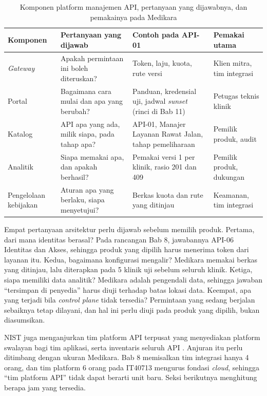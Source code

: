 \begin{table}[!htb]
  \centering
  \caption{Komponen platform manajemen API, pertanyaan yang dijawabnya, dan pemakainya pada Medikara}
  \label{tab:ch10-komponen}
  \footnotesize
  \begin{tabularx}{\textwidth}{H{1.8cm}GGH{2.3cm}}
    \hline
    \textbf{Komponen} & \textbf{Pertanyaan yang dijawab} & \textbf{Contoh pada API-01} & \textbf{Pemakai utama} \\ \hline
    \textit{Gateway} & Apakah permintaan ini boleh diteruskan? & Token, laju, kuota, rute versi & Klien mitra, tim integrasi \\ \hline
    Portal & Bagaimana cara mulai dan apa yang berubah? & Panduan, kredensial uji, jadwal \textit{sunset} (rinci di Bab 11) & Petugas teknis klinik \\ \hline
    Katalog & API apa yang ada, milik siapa, pada tahap apa? & API-01, Manajer Layanan Rawat Jalan, tahap pemeliharaan & Pemilik produk, audit \\ \hline
    Analitik & Siapa memakai apa, dan apakah berhasil? & Pemakai versi 1 per klinik, rasio 201 dan 409 & Pemilik produk, dukungan \\ \hline
    Pengelolaan kebijakan & Aturan apa yang berlaku, siapa menyetujui? & Berkas kuota dan rute yang ditinjau & Keamanan, tim integrasi \\ \hline
  \end{tabularx}
\end{table}

Empat pertanyaan arsitektur perlu dijawab sebelum memilih produk. Pertama, dari mana identitas berasal? Pada rancangan
Bab 8, jawabannya API-06 Identitas dan Akses, sehingga produk yang dipilih harus menerima token dari layanan itu. Kedua,
bagaimana konfigurasi mengalir? Medikara memakai berkas yang ditinjau, lalu diterapkan pada 5 klinik uji sebelum seluruh
klinik. Ketiga, siapa memiliki data analitik? Medikara adalah pengendali data, sehingga jawaban ``tersimpan di
penyedia'' harus diuji terhadap batas lokasi data. Keempat, apa yang terjadi bila \textit{control plane} tidak tersedia?
Permintaan yang sedang berjalan sebaiknya tetap dilayani, dan hal ini perlu diuji pada produk yang dipilih, bukan
diasumsikan.

NIST juga menganjurkan tim platform API terpusat yang menyediakan platform swalayan bagi tim aplikasi, serta inventaris
seluruh API \cite{nist-sp800-228}. Anjuran itu perlu ditimbang dengan ukuran Medikara. Bab 8 memisalkan tim
integrasi hanya 4 orang, dan tim platform 6 orang pada IT40713 mengurus fondasi \textit{cloud}, sehingga ``tim platform API'' tidak dapat berarti unit baru. Seksi berikutnya menghitung berapa jam
yang tersedia.

